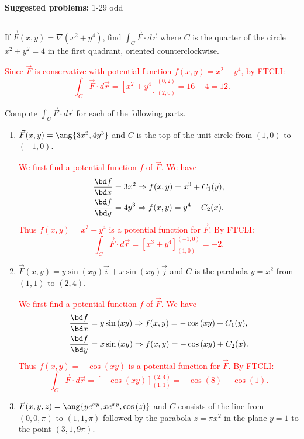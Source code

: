 \documentclass[12pt,reqno]{amsart}
\begin{document}
\textbf{Suggested problems:} 1-29 odd

\bigskip
\hrule

\bigskip
\prob If $\vec{F}(x,y) = \nabla (x^2+y^4)$, find $\int_C \vec{F} \cdot d\vec{r}$ where $C$ is the quarter of the circle $x^2+y^2=4$ in the first quadrant, oriented counterclockwise.

\bigskip
\textcolor{red}{Since $\vec{F}$ is conservative with potential function $f(x,y) = x^2+y^4$, by FTCLI:
	\[\int_C \vec{F} \cdot d\vec{r} = \left[x^2+y^4\right]_{(2,0)}^{(0,2)} = 16 - 4 = 12.
	\]}
\bigskip

\prob Compute $\int_C \vec{F} \cdot d \vec{r}$ for each of the following parts.

\bigskip
\begin{enumerate}
\item $\vec{F}(x,y) = \ang{3x^2,4y^3}$ and $C$ is the top of the unit circle from $(1,0)$ to $(-1,0)$.

\medskip
\textcolor{red}{We first find a potential function $f$ of $\vec{F}$. We have
\begin{align*}
\frac{\bd f}{\bd x} &= 3x^2 \Rightarrow f(x,y) = x^3 + C_1(y), \\
\frac{\bd f}{\bd y} &= 4y^3 \Rightarrow f(x,y) = y^4 + C_2(x).
\end{align*}
Thus $f(x,y) = x^3+y^4$ is a potential function for $\vec{F}$. By FTCLI:
	\[\int_C \vec{F} \cdot d\vec{r} = \left[x^3+y^4 \right]_{(1,0)}^{(-1,0)} = -2.
	\]}
\medskip

\item $\vec{F}(x,y) = y\sin{(xy)}\vec{i} + x\sin{(xy)}\vec{j}$ and $C$ is the parabola $y=x^2$ from $(1,1)$ to $(2,4)$.

\medskip
\textcolor{red}{We first find a potential function $f$ of $\vec{F}$. We have
\begin{align*}
\frac{\bd f}{\bd x} &= y\sin{(xy)} \Rightarrow f(x,y) = -\cos{(xy)}+C_1(y), \\
\frac{\bd f}{\bd y} &= x\sin{(xy)} \Rightarrow f(x,y) = -\cos{(xy)} + C_2(x).
\end{align*}
Thus $f(x,y) = -\cos{(xy)}$ is a potential function for $\vec{F}$. By FTCLI:
	\[\int_C \vec{F} \cdot d\vec{r} = \left[-\cos{(xy)} \right]_{(1,1)}^{(2,4)} = -\cos{(8)} + \cos{(1)}.
	\]}


\item $\vec{F}(x,y,z) = \ang{ye^{xy},x e^{xy}, \cos{(z)}}$ and $C$ consists of the line from $(0,0,\pi)$ to $(1,1,\pi)$ followed by the parabola $z=\pi x^2$ in the plane $y=1$ to the point $(3,1,9\pi)$.\vfill


\end{enumerate}
\end{document}
